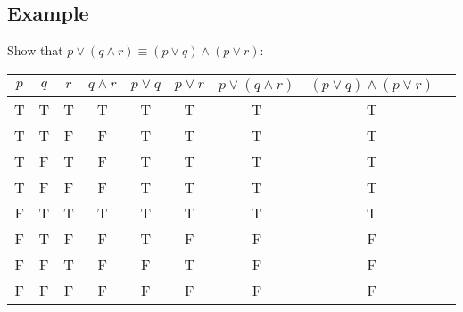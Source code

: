 \documentclass[letterpaper, 12pt]{math}
\begin{document}
\subsection*{Example}
Show that \( p \vee (q \wedge r) \equiv (p \vee q) \wedge (p \vee r) \):
\begin{center}
  \begin{tabular}{|c|c|c|c|c|c|c|c|c|}
    \hline
    \( p \) & \( q \) & \( r \) & \( q \wedge r \) & \( p \vee q \) &
    \( p \vee r \) & \( p \vee (q \wedge r) \) &
    \( (p \vee q) \wedge (p \vee r) \) \\ \hline
    T & T & T & T & T & T & T & T \\ \hline
    T & T & F & F & T & T & T & T \\ \hline
    T & F & T & F & T & T & T & T \\ \hline
    T & F & F & F & T & T & T & T \\ \hline
    F & T & T & T & T & T & T & T \\ \hline
    F & T & F & F & T & F & F & F \\ \hline
    F & F & T & F & F & T & F & F \\ \hline
    F & F & F & F & F & F & F & F \\ \hline
  \end{tabular}
\end{center}
\end{document}
